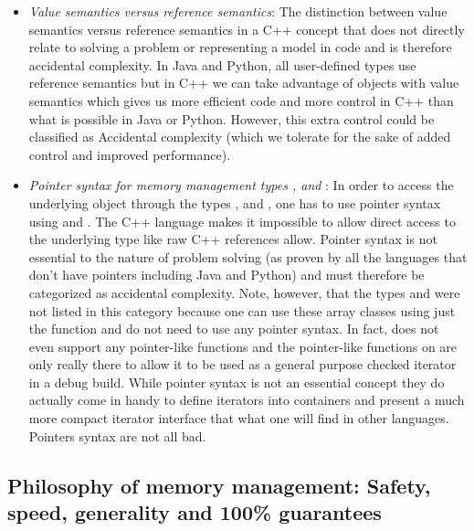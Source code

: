 \documentclass[pdf,ps2pdf,11pt]{SANDreport}
\begin{document}
\begin{itemize}

{}\item\textit{Value semantics versus reference semantics}: The
distinction between value semantics versus reference semantics in a
C++ concept that does not directly relate to solving a problem or
representing a model in code and is therefore accidental complexity.
In Java and Python, all user-defined types use reference semantics but
in C++ we can take advantage of objects with value semantics which
gives us more efficient code and more control in C++ than what is
possible in Java or Python.  However, this extra control could be
classified as Accidental complexity (which we tolerate for the sake
of added control and improved performance).

{}\item\textit{Pointer syntax for memory management types {},
and {}}: In order to access the underlying object through the
types {}, and {}, one has to use pointer syntax
using {} and {}.  The C++ language makes
it impossible to allow direct access to the underlying type like raw
C++ references allow.  Pointer syntax is not essential to the nature
of problem solving (as proven by all the languages that don't have
pointers including Java and Python) and must therefore be categorized
as accidental complexity.  Note, however, that the types
{} and {} were not listed in this
category because one can use these array classes using just the
{} function and do not need to use any
pointer syntax.  In fact, {} does not even support any
pointer-like functions and the pointer-like functions on
{} are only really there to allow it to be used as a
general purpose checked iterator in a debug build.  While pointer
syntax is not an essential concept they do actually come in handy to
define iterators into containers and present a much more compact
iterator interface that what one will find in other languages.
Pointers syntax are not all bad.

\end{itemize}


%
{}\subsection{Philosophy of memory management: Safety, speed,
generality and 100\% guarantees}
\label{sec:phylosophy-of-mem-mng}
%
\end{document}
